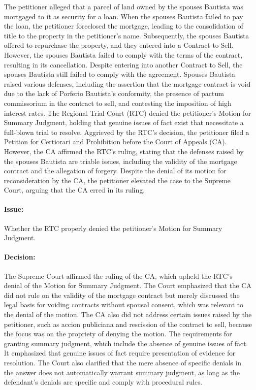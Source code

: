 \documentclass[
12pt,
oneside,
onehalfspacing,
headsepline
]{DigestCollection}
\begin{document}
The petitioner alleged that a parcel of land owned by the spouses Bautista was mortgaged to it as security for a loan. When the spouses Bautista failed to pay the loan, the petitioner foreclosed the mortgage, leading to the consolidation of title to the property in the petitioner's name. Subsequently, the spouses Bautista offered to repurchase the property, and they entered into a Contract to Sell. However, the spouses Bautista failed to comply with the terms of the contract, resulting in its cancellation. Despite entering into another Contract to Sell, the spouses Bautista still failed to comply with the agreement. Spouses Bautista raised various defenses, including the assertion that the mortgage contract is void due to the lack of Porferio Bautista's conformity, the presence of pactum commissorium in the contract to sell, and contesting the imposition of high interest rates. The Regional Trial Court (RTC) denied the petitioner's Motion for Summary Judgment, holding that genuine issues of fact exist that necessitate a full-blown trial to resolve. Aggrieved by the RTC's decision, the petitioner filed a Petition for Certiorari and Prohibition before the Court of Appeals (CA). However, the CA affirmed the RTC's ruling, stating that the defenses raised by the spouses Bautista are triable issues, including the validity of the mortgage contract and the allegation of forgery. Despite the denial of its motion for reconsideration by the CA, the petitioner elevated the case to the Supreme Court, arguing that the CA erred in its ruling.

\paragraph{Issue:}
\label{6e5d35e0-122f-11ef-aa24-9916ea601717}


Whether the RTC properly denied the petitioner's Motion for Summary Judgment.

\paragraph{Decision:}
\label{70023350-122f-11ef-aa24-9916ea601717}


The Supreme Court affirmed the ruling of the CA, which upheld the RTC's denial of the Motion for Summary Judgment. The Court emphasized that the CA did not rule on the validity of the mortgage contract but merely discussed the legal basis for voiding contracts without spousal consent, which was relevant to the denial of the motion. The CA also did not address certain issues raised by the petitioner, such as accion publiciana and rescission of the contract to sell, because the focus was on the propriety of denying the motion. The requirements for granting summary judgment, which include the absence of genuine issues of fact. It emphasized that genuine issues of fact require presentation of evidence for resolution. The Court also clarified that the mere absence of specific denials in the answer does not automatically warrant summary judgment, as long as the defendant's denials are specific and comply with procedural rules.
\end{document}
